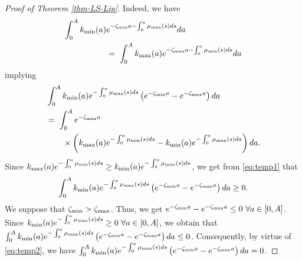 \documentclass[journal,twoside,web]{ieeecolor}
\begin{document}
\begin{proof}[Proof of Theorem \ref{thm-LS-Lip}]
Indeed, we have
\begin{align}
\nonumber \int_0^A k_{\rm min}(a)&e^{-\zeta_{\rm min} a - \int_0^a \mu_{\rm max}(s) ds} da \\ &=\; \int_0^A k_{\rm max}(a)e^{-\zeta_{\rm max} a - \int_0^a \mu_{\rm min}(s) ds} da 
\end{align}
implying
\begin{align}
&\int_0^A k_{\rm min}(a) e^{-\int_0^a \mu_{\rm max}(s) ds} \left( e^{-\zeta_{\rm min} a} - e^{-\zeta_{\rm max} a} \right)   da  \nonumber 
\\&=\; \int_0^A e^{-\zeta_{\rm max} a} \nonumber \\ & \qquad  \times \left( k_{\rm max}(a) e^{-\int_0^a \mu_{\rm min}(s) ds} - k_{\rm min}(a) e^{-\int_0^a \mu_{\rm max}(s)   ds } \right) da. \label{eq:temp1}
\end{align}
Since $k_{\rm max}(a) e^{-\int_0^a \mu_{\rm min}(s)ds} \ge k_{\rm min}(a) e^{-\int_0^a \mu_{\rm max}(s)ds}$, 
we get from \eqref{eq:temp1} that
\begin{align}
\int_0^A k_{\rm min}(a) e^{-\int_0^a \mu_{\rm max}(s)ds} \left( e^{-\zeta_{\rm min} a} - e^{-\zeta_{\rm max} a} \right) da \ge 0. \label{eq:temp2}
\end{align}
We suppose that $\zeta_{\rm min} > \zeta_{\rm max}$. Thus, we get $e^{-\zeta_{\rm min} a} - e^{-\zeta_{\rm max} a} \le 0 
\ \forall a \in [0,A]$. Since $k_{\rm min}(a) e^{-\int_0^a \mu_{\rm max}(s)ds} \ge 0 \ \forall a \in [0,A]$, we obtain that
$\int_0^A k_{\rm min}(a) e^{-\int_0^a \mu_{\rm max}(s) ds} \left( e^{-\zeta_{\rm min} a} - e^{-\zeta_{\rm max} a}\right)da \le 0$. Consequently, by virtue of \eqref{eq:temp2}, we have
$\int_0^A k_{\rm min}(a) e^{-\int_0^a \mu_{\rm max}(s) ds} \left(e^{-\zeta_{\rm min} a} - e^{-\zeta_{\rm max} a} \right)da = 0$.


\end{proof}
\end{document}

